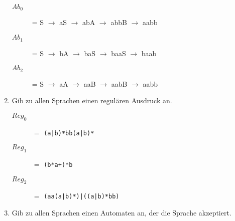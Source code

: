 \documentclass{lehramt-informatik-aufgabe}
\begin{document}
\begin{enumerate}
\begin{liAntwort}
\begin{description}
\item[$Ab_0$] = S $\rightarrow$ aS $\rightarrow$ abA $\rightarrow$ abbB $\rightarrow$ aabb
\item[$Ab_1$] = S $\rightarrow$ bA $\rightarrow$ baS $\rightarrow$ baaS $\rightarrow$ baab
\item[$Ab_2$] = S $\rightarrow$ aA $\rightarrow$ aaB $\rightarrow$ aabB $\rightarrow$ aabb
\end{description}

\end{liAntwort}

\item Gib zu allen Sprachen einen regulären Ausdruck an.

\begin{liAntwort}
\begin{description}
\item[$Reg_0$] $=$ \texttt{(a|b)*bb(a|b)*}

\item[$Reg_1$] $=$ \texttt{(b*a+)*b}

\item[$Reg_2$] $=$ \texttt{(aa(a|b)*)|((a|b)*bb)}
\end{description}
\end{liAntwort}


\item Gib zu allen Sprachen einen Automaten an, der die Sprache
akzeptiert.

\end{enumerate}
\end{document}
